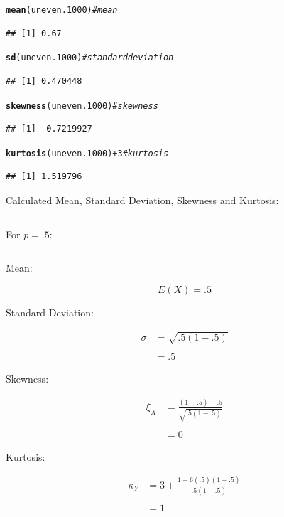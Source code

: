 \documentclass{article}\usepackage[]{graphicx}\usepackage[]{color}
\makeatletter
\newcommand{\hlnum}[1]{\textcolor[rgb]{0.686,0.059,0.569}{#1}}%
\newcommand{\hlcom}[1]{\textcolor[rgb]{0.678,0.584,0.686}{\textit{#1}}}%
\newcommand{\hlopt}[1]{\textcolor[rgb]{0,0,0}{#1}}%
\newcommand{\hlstd}[1]{\textcolor[rgb]{0.345,0.345,0.345}{#1}}%
\newcommand{\hlkwd}[1]{\textcolor[rgb]{0.737,0.353,0.396}{\textbf{#1}}}%
\newenvironment{kframe}{%
 \def\at@end@of@kframe{}%
 \ifinner\ifhmode%
  \def\at@end@of@kframe{\end{minipage}}%
  \begin{minipage}{\columnwidth}%
 \fi\fi%
 \def\FrameCommand##1{\hskip\@totalleftmargin \hskip-\fboxsep
 \colorbox{shadecolor}{##1}\hskip-\fboxsep
     \hskip-\linewidth \hskip-\@totalleftmargin \hskip\columnwidth}%
 \MakeFramed {\advance\hsize-\width
   \@totalleftmargin\z@ \linewidth\hsize
   \@setminipage}}%
 {\par\unskip\endMakeFramed%
 \at@end@of@kframe}
\newenvironment{knitrout}{}{} %
\makeatother
\begin{document}
\begin{enumerate}
\begin{enumerate}
\begin{knitrout}
\begin{kframe}
\begin{alltt}
\hlkwd{mean}\hlstd{(uneven.1000)}                \hlcom{#mean}
\end{alltt}
\begin{verbatim}
## [1] 0.67
\end{verbatim}
\begin{alltt}
\hlkwd{sd}\hlstd{(uneven.1000)}                  \hlcom{#standard deviation}
\end{alltt}
\begin{verbatim}
## [1] 0.470448
\end{verbatim}
\begin{alltt}
\hlkwd{skewness}\hlstd{(uneven.1000)}            \hlcom{#skewness}
\end{alltt}
\begin{verbatim}
## [1] -0.7219927
\end{verbatim}
\begin{alltt}
\hlkwd{kurtosis}\hlstd{(uneven.1000)}\hlopt{+}\hlnum{3}          \hlcom{#kurtosis}
\end{alltt}
\begin{verbatim}
## [1] 1.519796
\end{verbatim}
\end{kframe}
\end{knitrout}
Calculated Mean, Standard Deviation, Skewness and Kurtosis:

\[
\]

For $p=.5$:

\[
\]

Mean:

\[
E(X)=.5
\]

Standard Deviation:

\begin{align*}\sigma & =\sqrt{.5\left(1-.5\right)}\\
\\
 & =.5
\end{align*}

Skewness:

\begin{align*}\xi_{X} & =\frac{\left(1-.5\right)-.5}{\sqrt{.5\left(1-.5\right)}}\\
\\
 & =0
\end{align*}

Kurtosis:

\begin{align*}\kappa_{Y} & =3+\frac{1-6\left(.5\right)\left(1-.5\right)}{.5\left(1-.5\right)}\\
\\
 & =1
\end{align*}


\end{enumerate}
\end{enumerate}
\end{document}
